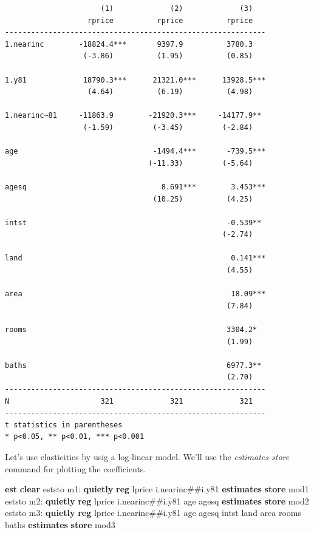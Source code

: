 \documentclass[
]{book}
\newenvironment{Shaded}{\begin{snugshade}}{\end{snugshade}}
\newcommand{\KeywordTok}[1]{\textcolor[rgb]{0.13,0.29,0.53}{\textbf{#1}}}
\newcommand{\NormalTok}[1]{#1}
\begin{document}
\begin{verbatim}
                      (1)             (2)             (3)   
                   rprice          rprice          rprice   
------------------------------------------------------------
1.nearinc        -18824.4***       9397.9          3780.3   
                  (-3.86)          (1.95)          (0.85)   

1.y81             18790.3***      21321.0***      13928.5***
                   (4.64)          (6.19)          (4.98)   

1.nearinc~81     -11863.9        -21920.3***     -14177.9** 
                  (-1.59)         (-3.45)         (-2.84)   

age                               -1494.4***       -739.5***
                                 (-11.33)         (-5.64)   

agesq                               8.691***        3.453***
                                  (10.25)          (4.25)   

intst                                              -0.539** 
                                                  (-2.74)   

land                                                0.141***
                                                   (4.55)   

area                                                18.09***
                                                   (7.84)   

rooms                                              3304.2*  
                                                   (1.99)   

baths                                              6977.3** 
                                                   (2.70)   
------------------------------------------------------------
N                     321             321             321   
------------------------------------------------------------
t statistics in parentheses
* p<0.05, ** p<0.01, *** p<0.001
\end{verbatim}

Let's use elasticities by usig a log-linear model. We'll use the \emph{estimates store} command for plotting the coefficients.

\begin{Shaded}
\begin{Highlighting}[]
\KeywordTok{est} \KeywordTok{clear}
\NormalTok{eststo m1: }\KeywordTok{quietly} \KeywordTok{reg}\NormalTok{ lprice i.nearinc\#\#i.y81}
\KeywordTok{estimates} \KeywordTok{store}\NormalTok{ mod1}
\NormalTok{eststo m2: }\KeywordTok{quietly} \KeywordTok{reg}\NormalTok{ lprice i.nearinc\#\#i.y81 age agesq}
\KeywordTok{estimates} \KeywordTok{store}\NormalTok{ mod2}
\NormalTok{eststo m3: }\KeywordTok{quietly} \KeywordTok{reg}\NormalTok{ lprice i.nearinc\#\#i.y81 age agesq intst land area rooms baths}
\KeywordTok{estimates} \KeywordTok{store}\NormalTok{ mod3}
\end{Highlighting}
\end{Shaded}
\end{document}
